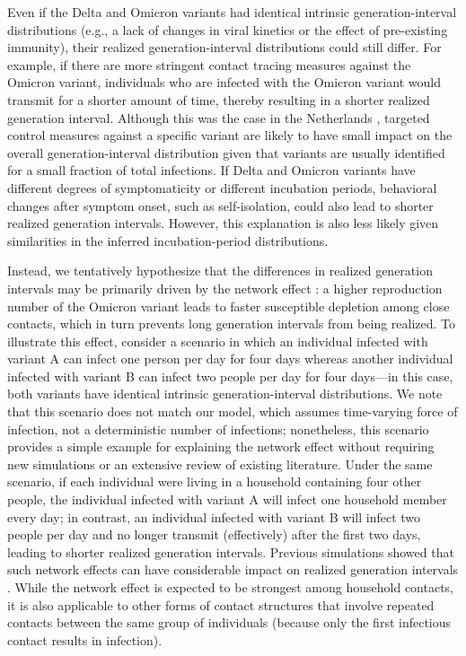\documentclass[12pt]{article}
\begin{document}
Even if the Delta and Omicron variants had identical intrinsic generation-interval distributions (e.g., a lack of changes in viral kinetics or the effect of pre-existing immunity), their realized generation-interval distributions could still differ.
For example, if there are more stringent contact tracing measures against the Omicron variant, individuals who are infected with the Omicron variant would transmit for a shorter amount of time, thereby resulting in a shorter realized generation interval.
Although this was the case in the Netherlands \citep{backer2021omicron}, targeted control measures against a specific variant are likely to have small impact on the overall generation-interval distribution given that variants are usually identified for a small fraction of total infections.
If Delta and Omicron variants have different degrees of symptomaticity or different incubation periods, behavioral changes after symptom onset, such as self-isolation, could also lead to shorter realized generation intervals.
However, this explanation is also less likely given similarities in the inferred incubation-period distributions.

Instead, we tentatively hypothesize that the differences in realized generation intervals may be primarily driven by the network effect \citep{park2020inferring,hart2022generation}: a higher reproduction number of the Omicron variant leads to faster susceptible depletion among close contacts, which in turn prevents long generation intervals from being realized. 
To illustrate this effect, consider a scenario in which an individual infected with variant A can infect one person per day for four days whereas another individual infected with variant B can infect two people per day for four days---in this case, both variants have identical intrinsic generation-interval distributions.
We note that this scenario does not match our model, which assumes time-varying force of infection, not a deterministic number of infections; nonetheless, this scenario provides a simple example for explaining the network effect without requiring new simulations or an extensive review of existing literature.
Under the same scenario, if each individual were living in a household containing four other people, the individual infected with variant A will infect one household member every day; in contrast, an individual infected with variant B will infect two people per day and no longer transmit (effectively) after the first two days, leading to shorter realized generation intervals.
Previous simulations showed that such network effects can have considerable impact on realized generation intervals \citep{park2020inferring}.
While the network effect is expected to be strongest among household contacts, it is also applicable to other forms of contact structures that involve repeated contacts between the same group of individuals (because only the first infectious contact results in infection).
\end{document}
